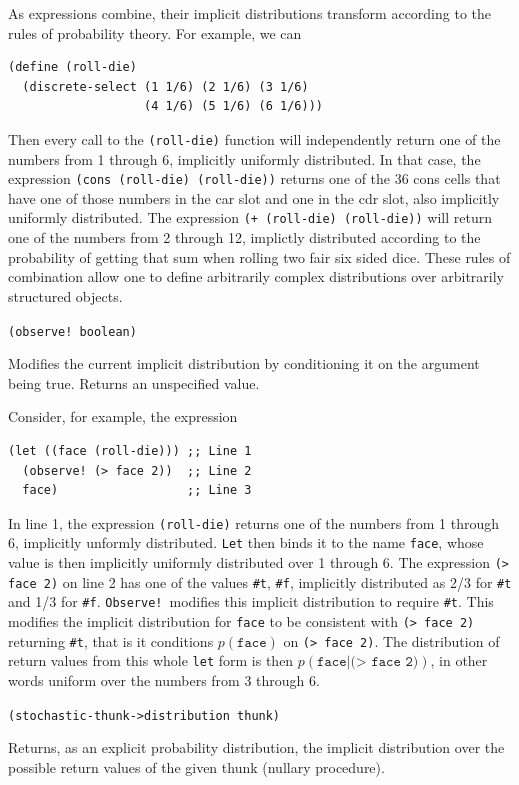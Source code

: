 \documentclass[10pt]{sigplanconf}
\newcommand{\code}[1]{\texttt{#1}}
\newenvironment{documentation}[1]{\vspace{5pt} \noindent \texttt{#1} \nopagebreak \begin{list}{}{\leftmargin 0.7cm}\item}{\end{list}}
\begin{document}
As expressions combine, their implicit distributions transform according
to the rules of probability theory.  For example,
we can
\begin{verbatim}
(define (roll-die)
  (discrete-select (1 1/6) (2 1/6) (3 1/6)
                   (4 1/6) (5 1/6) (6 1/6)))
\end{verbatim}
Then every call to the \code{(roll-die)} function will independently 
return one of
the numbers from 1 through 6, implicitly uniformly distributed.  In
that case, the expression \code{(cons (roll-die) (roll-die))} returns
one of the 36 cons cells that have one of those numbers in the car
slot and one in the cdr slot, also implicitly uniformly distributed.
The expression \code{(+ (roll-die) (roll-die))} will return one of the
numbers from 2 through 12, implictly distributed according to the
probability of getting that sum when rolling two fair six sided dice.
These rules of combination allow one to define arbitrarily complex
distributions over arbitrarily structured objects.

\begin{documentation}{(observe!\ boolean)}
Modifies the current implicit distribution by conditioning
it on the argument being true.  Returns an unspecified value.
\end{documentation}

Consider, for example, the expression
\begin{verbatim}
(let ((face (roll-die))) ;; Line 1
  (observe! (> face 2))  ;; Line 2
  face)                  ;; Line 3
\end{verbatim}
In line 1, the expression \code{(roll-die)} returns one of the numbers
from 1 through 6, implicitly unformly distributed.  \code{Let} then
binds it to the name \code{face}, whose value is then implicitly
uniformly distributed over 1 through 6.  The expression \code{(> face
2)} on line 2 has one of the values \code{\#t}, \code{\#f}, implicitly
distributed as 2/3 for \code{\#t} and 1/3 for \code{\#f}.
\code{Observe!}\ modifies this implicit distribution to require
\code{\#t}.  This modifies the implicit distribution for \code{face}
to be consistent with \code{(> face 2)} returning \code{\#t}, that is
it conditions $p(\code{face})$ on \code{(> face 2)}.  The
distribution of return values from this whole \code{let} form is then
$p(\code{face}|\code{(> face 2)})$, in other words uniform over the
numbers from 3 through 6.

\begin{documentation}{(stochastic-thunk->distribution thunk)}
Returns, as an explicit probability distribution, the implicit
distribution over the possible return values of the given thunk
(nullary procedure).
\end{documentation}
\end{document}
